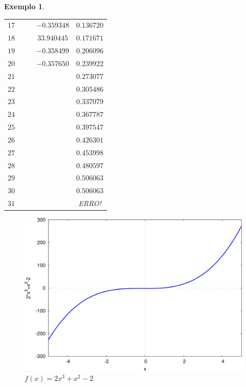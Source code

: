 \documentclass[a4paper, 10pt]{article} %
\newtheorem{exemplo}{Exemplo}[section]
\theoremstyle{definition}
\theoremstyle{definition}
\numberwithin{equation}{section} %
\numberwithin{lstlisting}{section}
\numberwithin{algorithm}{section}
\numberwithin{table}{section}
\begin{document}
\begin{exemplo}
\begin{table}[H]
\begin{tabular}{c|cccc}
    $17$ & 				  & 	   & 	$-0.359348$ & 	$0.136720$\\
    $18$ & 				  & 	   & 	$33.940445$ & 	$0.171671$\\
    $19$ & 				  & 	   & 	$-0.358499$ & 	$0.206096$\\
    $20$ & 				  & 	   & 	$-0.357650$ & 	$0.239922$\\
    $21$ & 						   & 	   & 	    & 	$0.273077$\\
    $22$ & 						   & 	   & 	    & 	$0.305486$\\
    $23$ & 						   & 	   & 	    & 	$0.337079$\\
    $24$ & 						   & 	   & 	    & 	$0.367787$\\
    $25$ & 						   & 	   & 	    & 	$0.397547$\\
    $26$ & 						   & 	   & 	    & 	$0.426301$\\
    $27$ & 						   & 	   & 	    & 	$0.453998$\\
    $28$ & 						   & 	   & 	    & 	$0.480597$\\
    $29$ & 						   & 	   & 	    & 	$0.506063$\\
    $30$ & 						   & 	   & 	    & 	$0.506063$\\
    $31$ & 						   & 	   & 	    & 	ERRO!
    \end{tabular}
  \end{table}
\end{exemplo}

\begin{figure}[H]\centering
 \includegraphics[scale = 0.5]{plot.png}
 \caption{$f(x) = 2x^3 + x^2 -2$}
\end{figure}
\end{document}
